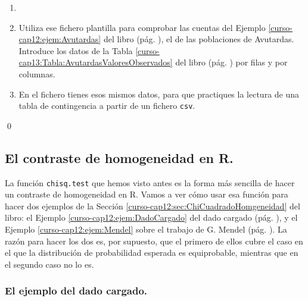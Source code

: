 \documentclass[10pt,a4paper]{article}\usepackage[]{graphicx}\usepackage[]{color}
\newcounter {cont01}
\begin{document}
\begin{ejercicio}
\label{tut12:ejercicio02}

\begin{enumerate}
  \item[]
  \item Utiliza ese fichero plantilla  para comprobar las cuentas del Ejemplo \ref{curso-cap12:ejem:Avutardas} del libro (pág. \pageref{curso-cap12:ejem:Avutardas}), el de las poblaciones de Avutardas. Introduce los datos de la Tabla \ref{curso-cap13:Tabla:AvutardasValoresObservados} del libro (pág. \pageref{curso-cap13:Tabla:AvutardasValoresObservados}) por filas y por columnas.
  \item En el fichero  tienes esos mismos datos, para que practiques la lectura de una tabla de contingencia a partir de un fichero {\tt csv}.
\end{enumerate}

\qed
\end{ejercicio}

\subsection{El contraste de homogeneidad en R.}
\label{tut12:subsec:ContrasteHomogeneidadR}

La función {\tt chisq.test} que hemos visto antes es la forma más sencilla de hacer un contraste de homogeneidad en R. Vamos a ver cómo usar esa función para hacer dos ejemplos de la Sección \ref{curso-cap12:sec:ChiCuadradoHomgeneidad} del libro: el Ejemplo \ref{curso-cap12:ejem:DadoCargado} del dado cargado (pág. \pageref{curso-cap12:ejem:DadoCargado}), y el Ejemplo \ref{curso-cap12:ejem:Mendel} sobre el trabajo de G. Mendel (pág. \pageref{curso-cap12:ejem:Mendel}). La razón para hacer los dos es, por supuesto, que el primero de ellos cubre el caso en el que la distribución de probabilidad esperada es equiprobable, mientras que en el segundo caso no lo es.

\subsubsection*{El ejemplo del dado cargado.}
\end{document}
